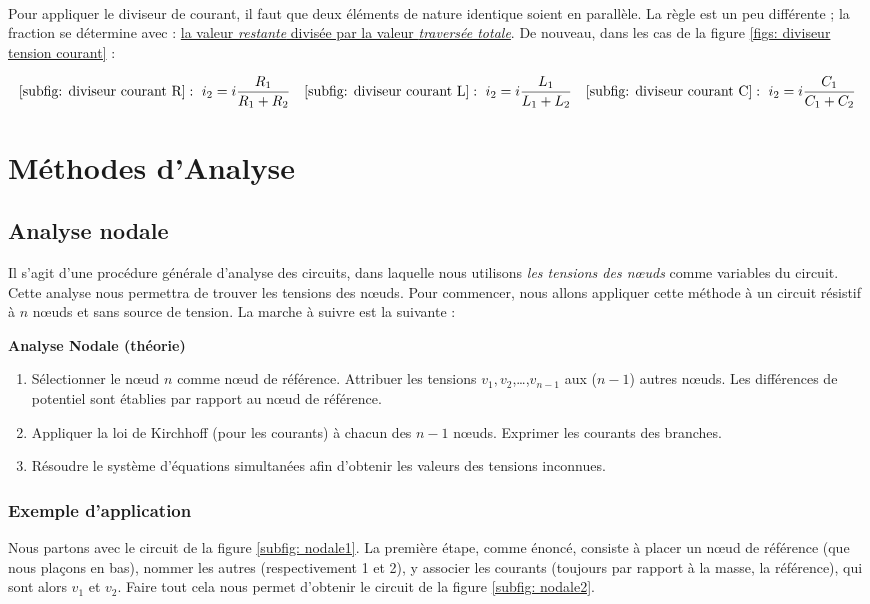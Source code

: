 \documentclass[12pt,a4paper]{article}
\begin{document}
\\
Pour appliquer le diviseur de courant, il faut que deux éléments de nature identique soient en parallèle. La règle est un peu différente ; la fraction se détermine avec : \uline{la valeur \textit{restante} divisée par la valeur \textit{traversée totale}}. De nouveau, dans les cas de la figure \ref{figs: diviseur tension courant} :
\begin{boite}
	\begin{equation}
		\ref{subfig: diviseur courant R}:\ i_2 = i\frac{R_1}{R_1 + R_2} \quad \ref{subfig: diviseur courant L} :\ i_2 = i\frac{L_1}{L_1 + L_2} \quad \ref{subfig: diviseur courant C} :\ i_2 = i\frac{C_1}{C_1 + C_2}
	\end{equation}
\end{boite}

\section{Méthodes d'Analyse}
\label{section: methode analyse}
\setcounter{equation}{0}
\subsection{Analyse nodale}
\label{subsection: analyse nodale}
Il s'agit d'une procédure générale d'analyse des circuits, dans laquelle nous utilisons \textit{les tensions des n\oe uds} comme variables du circuit. Cette analyse nous permettra de trouver les tensions des n\oe uds. Pour commencer, nous allons appliquer cette méthode à un circuit résistif à $n$ n\oe uds et sans source de tension. La marche à suivre est la suivante :
\begin{boite}
	\textbf{Analyse Nodale (théorie)}
	\begin{enumerate}
		\item 	Sélectionner le n\oe ud $n$ comme n\oe ud de référence. Attribuer les tensions $v_1,v_2$,\ldots,$v_{n-1}$ aux ($n-1$) autres n\oe uds. Les différences de potentiel sont établies par rapport au n\oe ud de référence.
		\item 	Appliquer la loi de Kirchhoff (pour les courants) à chacun des $n-1$ n\oe uds. Exprimer les courants des branches.
		\item 	Résoudre le système d'équations simultanées afin d’obtenir les valeurs des tensions inconnues.
	\end{enumerate}
\end{boite}

\subsubsection{Exemple d'application}
\label{exemple: application analyse nodale}
Nous partons avec le circuit de la figure \ref{subfig: nodale1}. La première étape, comme énoncé, consiste à placer un n\oe ud de référence (que nous plaçons en bas), nommer les autres (respectivement 1 et 2), y associer les courants (toujours par rapport à la masse, la référence), qui sont alors $v_1$ et $v_2$. Faire tout cela nous permet d'obtenir le circuit de la figure \ref{subfig: nodale2}. 
\end{document}
